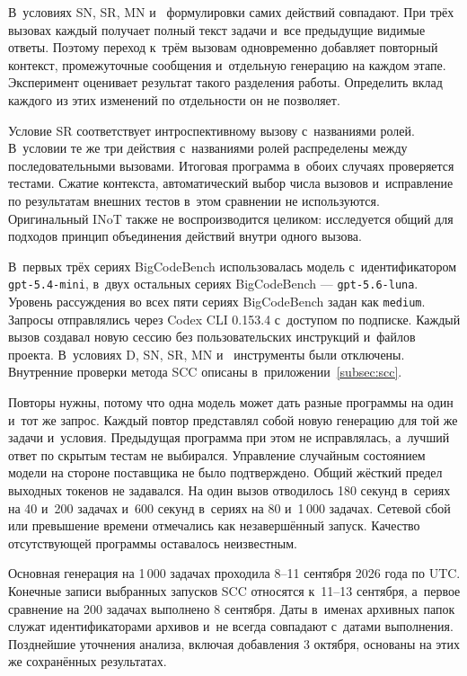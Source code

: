 В~условиях SN, SR, MN и~\MultiCallRole{} формулировки самих действий совпадают. При трёх вызовах каждый получает полный текст задачи и~все предыдущие видимые ответы. Поэтому переход к~трём вызовам одновременно добавляет повторный контекст, промежуточные сообщения и~отдельную генерацию на каждом этапе. Эксперимент оценивает результат такого разделения работы. Определить вклад каждого из этих изменений по отдельности он не позволяет.

Условие SR соответствует интроспективному вызову с~названиями ролей. В~условии \MultiCallRole{} те же три действия с~названиями ролей распределены между последовательными вызовами. Итоговая программа в~обоих случаях проверяется тестами. Сжатие контекста, автоматический выбор числа вызовов и~исправление по результатам внешних тестов в~этом сравнении не используются. Оригинальный INoT также не воспроизводится целиком: исследуется общий для подходов принцип объединения действий внутри одного вызова.

В~первых трёх сериях BigCodeBench использовалась модель с~идентификатором \texttt{gpt-5.4-mini}, в~двух остальных сериях BigCodeBench --- \texttt{gpt-5.6-luna}. Уровень рассуждения во всех пяти сериях BigCodeBench задан как \texttt{medium}. Запросы отправлялись через Codex CLI 0.153.4 с~доступом по подписке. Каждый вызов создавал новую сессию без пользовательских инструкций и~файлов проекта. В~условиях D, SN, SR, MN и~\MultiCallRole{} инструменты были отключены. Внутренние проверки метода SCC описаны в~приложении~\ref{subsec:scc}.

Повторы нужны, потому что одна модель может дать разные программы на один и~тот же запрос. Каждый повтор представлял собой новую генерацию для той же задачи и~условия. Предыдущая программа при этом не исправлялась, а~лучший ответ по скрытым тестам не выбирался. Управление случайным состоянием модели на стороне поставщика не было подтверждено. Общий жёсткий предел выходных токенов не задавался. На один вызов отводилось 180 секунд в~сериях на 40 и~200 задачах и~600 секунд в~сериях на 80 и~1\,000 задачах. Сетевой сбой или превышение времени отмечались как незавершённый запуск. Качество отсутствующей программы оставалось неизвестным.

Основная генерация на 1\,000 задачах проходила 8--11 сентября 2026 года по UTC. Конечные записи выбранных запусков SCC относятся к~11--13 сентября, а~первое сравнение на 200 задачах выполнено 8 сентября. Даты в~именах архивных папок служат идентификаторами архивов и~не всегда совпадают с~датами выполнения. Позднейшие уточнения анализа, включая добавления 3 октября, основаны на этих же сохранённых результатах.

